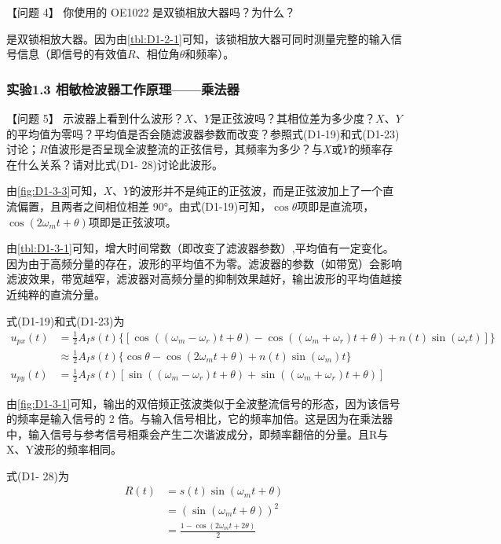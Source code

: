 \documentclass[dvipsnames, svgnames,a4paper,11pt]{article}
\begin{document}
		【问题 4】 你使用的 OE1022 是双锁相放大器吗？为什么？

		是双锁相放大器。因为由\cref{tbl:D1-2-1}可知，该锁相放大器可同时测量完整的输入信号信息（即信号的有效值$R$、相位角$\theta$和频率）。



	\subsubsection*{实验1.3 \quad 相敏检波器工作原理——乘法器}

		【问题 5】 示波器上看到什么波形？$X$、$Y$是正弦波吗？其相位差为多少度？$X$、$Y$的平均值为零吗？平均值是否会随滤波器参数而改变？参照式(D1-19)和式(D1-23)讨论；$R$值波形是否呈现全波整流的正弦信号，其频率为多少？与$X$或$Y$的频率存在什么关系？请对比式(D1- 28)讨论此波形。

		由\cref{fig:D1-3-3}可知，$X$、$Y$的波形并不是纯正的正弦波，而是正弦波加上了一个直流偏置，且两者之间相位相差 90°。由式(D1-19)可知，$\cos\theta$项即是直流项，$\cos(2\omega_m t + \theta)$项即是正弦波项。

		由\cref{tbl:D1-3-1}可知，增大时间常数（即改变了滤波器参数）,平均值有一定变化。因为由于高频分量的存在，波形的平均值不为零。滤波器的参数（如带宽）会影响滤波效果，带宽越窄，滤波器对高频分量的抑制效果越好，输出波形的平均值越接近纯粹的直流分量。



		式(D1-19)和式(D1-23)为
		\begin{align*}
			u_{px}(t) &= \frac{1}{2} A_I s(t) \{ [ \cos((\omega_m - \omega_r)t + \theta) - \cos((\omega_m + \omega_r)t + \theta) + n(t)\sin(\omega_r t) ]\} \\
			&\approx \frac{1}{2} A_I s(t)\{ \cos\theta - \cos(2\omega_m t + \theta) + n(t)\sin(\omega_m)t\} \\
			u_{py}(t) &= \frac{1}{2} A_I s(t) [ \sin((\omega_m - \omega_r)t + \theta) + \sin((\omega_m + \omega_r)t + \theta) ]
		\end{align*}


		由\cref{fig:D1-3-1}可知，输出的双倍频正弦波类似于全波整流信号的形态，因为该信号的频率是输入信号的 2 倍。与输入信号相比，它的频率加倍。这是因为在乘法器中，输入信号与参考信号相乘会产生二次谐波成分，即频率翻倍的分量。且R与X、Y波形的频率相同。

		式(D1- 28)为
		\begin{align*}
			R(t) &= s(t) \sin(\omega_m t + \theta) \\
			&= (\sin(\omega_m t + \theta))^2 \\
			&= \frac{1 - \cos(2\omega_m t + 2\theta)}{2}
		\end{align*}
\end{document}
